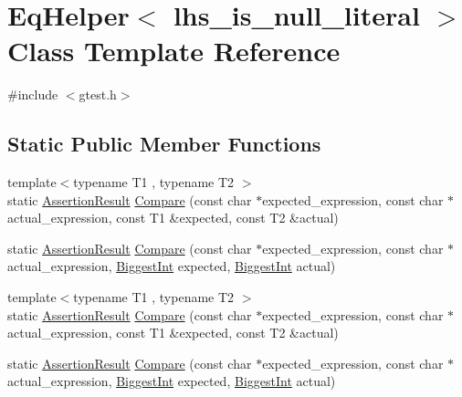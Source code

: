 \hypertarget{classtesting_1_1internal_1_1EqHelper}{\section{\-Eq\-Helper$<$ lhs\-\_\-is\-\_\-null\-\_\-literal $>$ \-Class \-Template \-Reference}
\label{d1/d85/classtesting_1_1internal_1_1EqHelper}
}


{\ttfamily \#include $<$gtest.\-h$>$}

\subsection*{\-Static \-Public \-Member \-Functions}
\begin{DoxyCompactItemize}
\item 
{\footnotesize template$<$typename T1 , typename T2 $>$ }\\static \hyperlink{classtesting_1_1AssertionResult}{\-Assertion\-Result} \hyperlink{classtesting_1_1internal_1_1EqHelper_acc78a1bad0edc8409d4ba7007dba5563}{\-Compare} (const char $\ast$expected\-\_\-expression, const char $\ast$actual\-\_\-expression, const \-T1 \&expected, const \-T2 \&actual)
\item 
static \hyperlink{classtesting_1_1AssertionResult}{\-Assertion\-Result} \hyperlink{classtesting_1_1internal_1_1EqHelper_a20389e2c5459d28b3821fc9af316bd14}{\-Compare} (const char $\ast$expected\-\_\-expression, const char $\ast$actual\-\_\-expression, \hyperlink{namespacetesting_1_1internal_ae8f73370150f905887720532fa9f572e}{\-Biggest\-Int} expected, \hyperlink{namespacetesting_1_1internal_ae8f73370150f905887720532fa9f572e}{\-Biggest\-Int} actual)
\item 
{\footnotesize template$<$typename T1 , typename T2 $>$ }\\static \hyperlink{classtesting_1_1AssertionResult}{\-Assertion\-Result} \hyperlink{classtesting_1_1internal_1_1EqHelper_acc78a1bad0edc8409d4ba7007dba5563}{\-Compare} (const char $\ast$expected\-\_\-expression, const char $\ast$actual\-\_\-expression, const \-T1 \&expected, const \-T2 \&actual)
\item 
static \hyperlink{classtesting_1_1AssertionResult}{\-Assertion\-Result} \hyperlink{classtesting_1_1internal_1_1EqHelper_a20389e2c5459d28b3821fc9af316bd14}{\-Compare} (const char $\ast$expected\-\_\-expression, const char $\ast$actual\-\_\-expression, \hyperlink{namespacetesting_1_1internal_ae8f73370150f905887720532fa9f572e}{\-Biggest\-Int} expected, \hyperlink{namespacetesting_1_1internal_ae8f73370150f905887720532fa9f572e}{\-Biggest\-Int} actual)
\end{DoxyCompactItemize}


